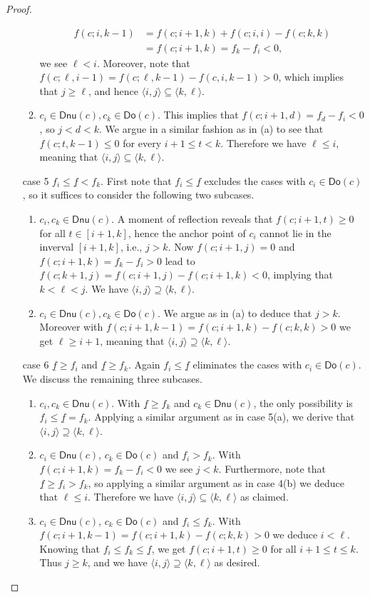 \documentclass[reqno]{amsart}
\numberwithin{equation}{section}
\theoremstyle{definition}
\theoremstyle{named}
\def\Dnu{\mathsf{Dnu}}
\def\Do{\mathsf{Do}}
\def\uf{\underline{f}}
\begin{document}
\begin{proof}
\begin{enumerate}[font=\bfseries]
\begin{enumerate}
    	\begin{align*}
    	f(c;i,k-1)&=f(c;i+1,k)+f(c;i,i)-f(c;k,k)\\
    	&=f(c;i+1,k)=f_k-f_i<0,
    	\end{align*}
    	we see $\ell<i$. Moreover, note that $f(c;\ell,i-1)=f(c;\ell,k-1)-f(c,i,k-1)>0$, which implies that $j\ge\ell$, and hence $\langle i,j\rangle\subseteq \langle k,\ell\rangle$.     	   	
    	\item $c_i\in \Dnu(c), c_k\in \Do(c)$. This implies that $f(c;i+1,d)=f_d-f_i<0$, so $j<d<k$. We argue in a similar fashion as in (a) to see that $f(c;t,k-1)\le 0$ for every $i+1\le t<k$. Therefore we have $\ell\le i$, meaning that $\langle i,j\rangle\subseteq \langle k,\ell\rangle$.  
    \end{enumerate}
    \item[case 5]$f_i \le \uf< f_k$. First note that $f_i\le\uf$ excludes the cases with $c_i\in\Do(c)$, so it suffices to consider the following two subcases.
    \begin{enumerate}
    	\item $c_i,c_k\in \Dnu(c)$. A moment of reflection reveals that $f(c;i+1,t)\ge 0$ for all $t\in [i+1,k]$, hence the anchor point of $c_i$ cannot lie in the inverval $[i+1,k]$, i.e., $j>k$. Now $f(c;i+1,j)=0$ and $f(c;i+1,k)=f_k-f_i>0$ lead to $f(c;k+1,j)=f(c;i+1,j)-f(c;i+1,k)<0$, implying that $k<\ell<j$. We have $\langle i,j\rangle\supseteq \langle k,\ell\rangle$.    	   	
    	\item $c_i\in \Dnu(c), c_k\in \Do(c)$. We argue as in (a) to deduce that $j>k$. Moreover with $f(c;i+1,k-1)=f(c;i+1,k)-f(c;k,k)>0$ we get $\ell\ge i+1$, meaning that $\langle i,j\rangle\supseteq \langle k,\ell\rangle$.     	
    \end{enumerate}
	\item[case 6] $\uf\ge f_i$ and $\uf\ge f_k$. Again $f_i\le\uf$ eliminates the cases with $c_i\in\Do(c)$. We discuss the remaining three subcases.
	\begin{enumerate}	
		\item $c_i,c_k\in\Dnu(c)$. With $\uf\ge f_k$ and $c_k\in\Dnu(c)$, the only possibility is $f_i\le \uf=f_k$. Applying a similar argument as in case 5(a), we derive that $\langle i,j\rangle\supseteq \langle k,\ell\rangle$.
		\item $c_i\in \Dnu(c)$, $c_k\in \Do(c)$ and $f_i> f_k$. With $f(c;i+1,k)=f_k-f_i<0$ we see $j<k$. Furthermore, note that $\uf\ge f_i>f_k$, so applying a similar argument as in case 4(b) we deduce that $\ell\le i$. Therefore we have $\langle i,j\rangle\subseteq \langle k,\ell\rangle$ as claimed.		   
		\item $c_i\in \Dnu(c)$, $c_k\in\Do(c)$ and $f_i\le f_k$. With $f(c;i+1,k-1)=f(c;i+1,k)-f(c;k,k)>0$ we deduce $i<\ell$. Knowing that $f_i\le f_k\le\uf$, we get $f(c;i+1,t)\ge 0$ for all $i+1\le t\le k$. Thus $j\ge k$, and we have $\langle i,j\rangle\supseteq \langle k,\ell\rangle$ as desired.
	\end{enumerate}
\end{enumerate}
\end{proof}
\end{document}
